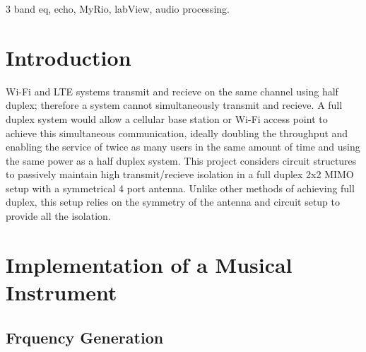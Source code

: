 \begin{IEEEkeywords}
3 band eq, echo, MyRio, labView, audio processing. 
\end{IEEEkeywords}

\IEEEpeerreviewmaketitle



\section{Introduction}
%
%
%
%
 Wi-Fi and LTE systems transmit and recieve on the same channel using half duplex; therefore a system cannot simultaneously transmit and recieve.
 A full duplex system would allow a cellular base station or Wi-Fi access point to achieve this simultaneous communication, ideally doubling the throughput and enabling the service of twice as many users in the same amount of time and using the same power as a half duplex system. 
 This project considers circuit structures to passively maintain high transmit/recieve isolation in a full duplex 2x2 MIMO setup with a symmetrical 4 port antenna. 
Unlike other methods of achieving full duplex, this setup relies on the symmetry of the antenna and circuit setup to provide all the isolation.


\section{Implementation of a Musical Instrument}
\subsection{Frquency Generation}



